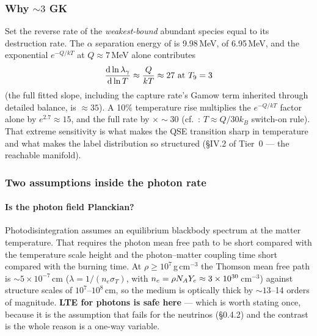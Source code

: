 \subsubsection{Why \texorpdfstring{${\sim}3$}{~3} GK}
\label{sec:why3gk}

Set the reverse rate of the \emph{weakest-bound} abundant species equal to its
destruction rate. The $\alpha$ separation energy of  is 9.98\,MeV,
of  6.95\,MeV, and the exponential $e^{-Q/kT}$ at $Q \approx 7$\,MeV
alone contributes
%
\begin{equation*}
\frac{\mathrm{d}\ln\lambda_\gamma}{\mathrm{d}\ln T} \approx \frac{Q}{kT} \approx 27
\ \text{at } T_{9}=3
\end{equation*}
%
(the full fitted slope, including the capture rate's Gamow term inherited
through detailed balance, is $\approx 35$). A 10\% temperature rise multiplies
the $e^{-Q/kT}$ factor alone by $e^{2.7} \approx 15$, and the full rate by
${\times}{\sim}30$ (cf.\ \citealp{hix1999b}: $T \approx Q/30k_B$ switch-on
rule). That extreme sensitivity is what makes the QSE transition sharp in
temperature and what makes the label distribution so structured (\S IV.2 of
Tier~0 --- the reachable manifold).

\subsubsection{Two assumptions inside the photon rate}
\label{sec:photon-assumptions}

\paragraph{Is the photon field Planckian?} Photodisintegration assumes an
equilibrium blackbody spectrum at the matter temperature. That requires the
photon mean free path to be short compared with the temperature scale height and
the photon--matter coupling time short compared with the burning time. At
$\rho \ge 10^7$\,g\,cm$^{-3}$ the Thomson mean free path is
${\sim}5\times10^{-7}$\,cm ($\lambda = 1/(n_e\sigma_T)$, with
$n_e = \rho N_AY_{e} \approx 3\times10^{30}$\,cm$^{-3}$) against structure scales
of $10^7$--$10^8$\,cm, so the medium is optically thick by ${\sim}13$--14 orders
of magnitude. \textbf{LTE for photons is safe here} --- which is worth stating
once, because it is the assumption that fails for the neutrinos (\S0.4.2) and
the contrast is the whole reason \Ye{} is a one-way variable.

